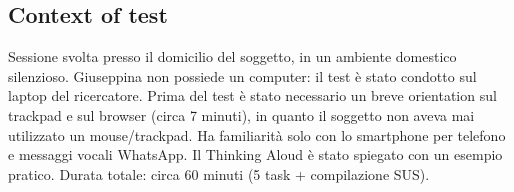 ﻿\documentclass[11pt,a4paper]{article}
\begin{document}
\subsection*{Context of test}
\begin{tcolorbox}[base]
Sessione svolta presso il domicilio del soggetto, in un
ambiente domestico silenzioso. Giuseppina non possiede un
computer: il test è stato condotto sul laptop del ricercatore.
Prima del test è stato necessario un breve orientation sul
trackpad e sul browser (circa 7 minuti), in quanto il soggetto
non aveva mai utilizzato un mouse/trackpad. Ha familiarità
solo con lo smartphone per telefono e messaggi vocali WhatsApp.
Il Thinking Aloud è stato spiegato con un esempio pratico.
Durata totale: circa 60 minuti (5 task + compilazione SUS).
\end{tcolorbox}
\end{document}
